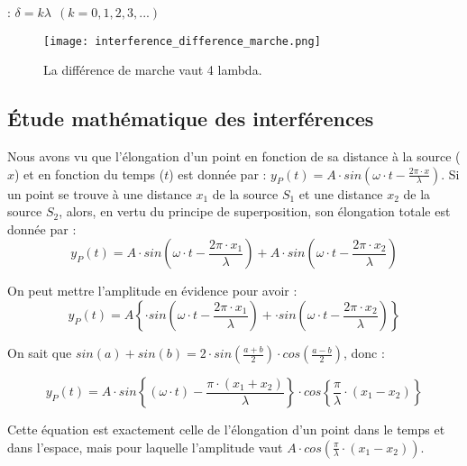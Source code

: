 \begin{encadre}
     : \(\delta = k \lambda \ \ (k=0,1,2,3,...)\)
\end{encadre}

\newpage

\begin{figure}[h!]
    \centering
    \texttt{[image: interference\_difference\_marche.png]}
    \caption{La différence de marche vaut 4 lambda.}
\end{figure}

\newpage

\subsection{Étude mathématique des interférences}
Nous avons vu que l'élongation d'un point en fonction de sa distance à la source (\(x\)) et en fonction du temps (\(t\)) est donnée par : \(y_P (t) = A \cdot sin (\omega \cdot t- \frac{2 \pi  \cdot x}{\lambda})\).
Si un point se trouve à une distance \(x_1\) de la source \(S_1\) et une distance \(x_2\) de la source \(S_2\), alors, en vertu du principe de superposition, son élongation totale est donnée par :
\begin{equation}
    y_P (t) = A \cdot sin (\omega \cdot t- \frac{2 \pi  \cdot x_1}{\lambda}) + A \cdot sin (\omega \cdot t- \frac{2 \pi  \cdot x_2}{\lambda})
\end{equation}

On peut mettre l'amplitude en évidence pour avoir :
\begin{equation}
    y_P (t) = A \left \lbrace \cdot sin (\omega  \cdot t- \frac{2 \pi  \cdot x_1}{\lambda}) +  \cdot sin (\omega \cdot t- \frac{2 \pi  \cdot x_2}{\lambda}) \right \rbrace
\end{equation}

On sait que \(sin( a) + sin (b)=2 \cdot sin( \frac{a+b}{2}) \cdot cos(\frac{a-b}{2})\), donc :

\begin{equation}
    y_P (t) = A \cdot  sin \left \lbrace (\omega  \cdot t)- \frac{ \pi  \cdot (x_1+x_2)}{\lambda} \right \rbrace   \cdot cos \left \lbrace \frac{\pi}{\lambda}\cdot (x_1-x_2) \right \rbrace
\end{equation}

Cette équation est exactement celle de l'élongation d'un point dans le temps et dans l'espace, mais pour laquelle l'amplitude vaut \(A \cdot cos (\frac{\pi}{\lambda}\cdot (x_1-x_2) )\).

